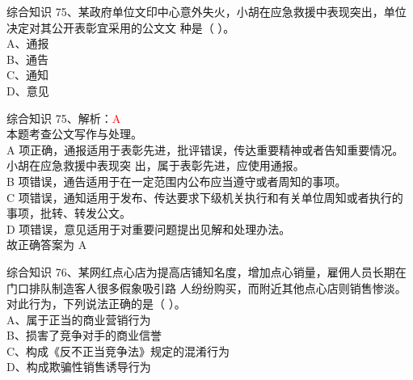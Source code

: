 \documentclass[aspectratio=169]{beamer}
\begin{document}
\begin{frame}[t]{综合知识}
    75、某政府单位文印中心意外失火，小胡在应急救援中表现突出，单位决定对其公开表彰宜采用的公文文
    种是（ ）。  \\
    A、通报      \\
    B、通告      \\
    C、通知      \\
    D、意见      \\
\end{frame}                           

\begin{frame}[t]{综合知识}
    75、解析：\textcolor{red}{A}\\
    本题考查公文写作与处理。\\
    A 项正确，通报适用于表彰先进，批评错误，传达重要精神或者告知重要情况。小胡在应急救援中表现突
    出，属于表彰先进，应使用通报。\\
    B 项错误，通告适用于在一定范围内公布应当遵守或者周知的事项。\\
    C 项错误，通知适用于发布、传达要求下级机关执行和有关单位周知或者执行的事项，批转、转发公文。\\
    D 项错误，意见适用于对重要问题提出见解和处理办法。\\
    故正确答案为 A\\
\end{frame}                           



\begin{frame}[t]{综合知识}
    76、某网红点心店为提高店铺知名度，增加点心销量，雇佣人员长期在门口排队制造客人很多假象吸引路
    人纷纷购买，而附近其他点心店则销售惨淡。对此行为，下列说法正确的是（ ）。  \\
    A、属于正当的商业营销行为                                                  \\
    B、损害了竞争对手的商业信誉                                                \\
    C、构成《反不正当竞争法》规定的混淆行为                                    \\
    D、构成欺骗性销售诱导行为                                                  \\
\end{frame}                           
\end{document}
